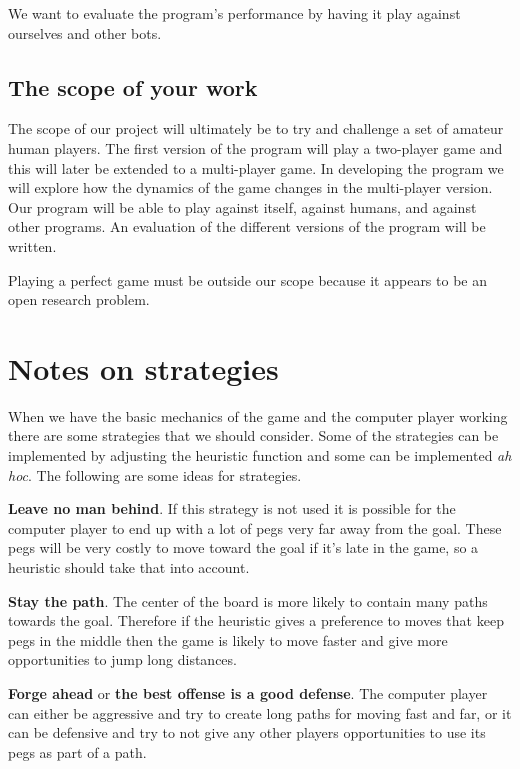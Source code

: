 \documentclass[a4paper,11pt]{article}
\begin{document}
We want to evaluate the program's performance by having it play
against ourselves and other bots.


\subsection{The scope of your work}

The scope of our project will ultimately be to try and challenge a set
of amateur human players. The first version of the program will play a
two-player game and this will later be extended to a multi-player
game. In developing the program we will explore how the dynamics of
the game changes in the multi-player version. Our program will be able
to play against itself, against humans, and against other programs. An
evaluation of the different versions of the program will be written.

Playing a perfect game must be outside our scope because it appears to
be an open research problem.

\section{Notes on strategies}

When we have the basic mechanics of the game and the computer player
working there are some strategies that we should consider. Some of the
strategies can be implemented by adjusting the heuristic function and
some can be implemented \emph{ah hoc}. The following are some ideas
for strategies.

\textbf{Leave no man behind}. If this strategy is not used it is
possible for the computer player to end up with a lot of pegs very far
away from the goal. These pegs will be very costly to move toward the
goal if it's late in the game, so a heuristic should take that into
account.

\textbf{Stay the path}. The center of the board is more likely to
contain many paths towards the goal. Therefore if the heuristic gives
a preference to moves that keep pegs in the middle then the game is
likely to move faster and give more opportunities to jump long
distances.

\textbf{Forge ahead} or \textbf{the best offense is a good defense}.
The computer player can either be aggressive and try to create long
paths for moving fast and far, or it can be defensive and try to not
give any other players opportunities to use its pegs as part of a
path.
\end{document}
